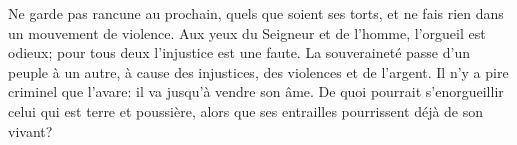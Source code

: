 Ne garde pas rancune au prochain, quels que soient ses torts,
	et ne fais rien dans un mouvement de violence.
Aux yeux du Seigneur et de l’homme, l’orgueil est odieux;
	pour tous deux l’injustice est une faute.
La souveraineté passe d’un peuple à un autre,
	à cause des injustices, des violences et de l’argent.
Il n’y a pire criminel que l’avare: il va jusqu’à vendre son âme.
De quoi pourrait s’enorgueillir celui qui est terre et poussière,
	alors que ses entrailles pourrissent déjà de son vivant?
